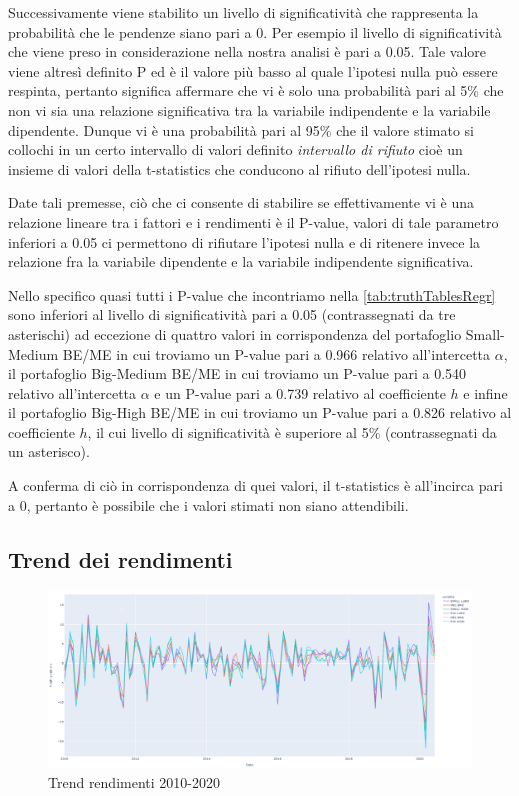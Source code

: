 Successivamente viene stabilito un livello di significatività che rappresenta la probabilità che le pendenze siano pari a 0. Per esempio il livello di significatività che viene preso in considerazione nella nostra analisi è pari a 0.05. Tale valore viene altresì definito P ed è il valore più basso al quale l'ipotesi nulla può essere respinta, pertanto significa affermare che vi è solo una probabilità pari al 5\% che non vi sia una relazione significativa tra la variabile indipendente e la variabile dipendente. Dunque vi è una probabilità pari al 95\% che il valore stimato si collochi in un certo intervallo di valori definito \textit{intervallo di rifiuto} cioè un insieme di valori della t-statistics che conducono al rifiuto dell'ipotesi nulla.  

Date tali premesse, ciò che ci consente di stabilire se effettivamente vi è una relazione lineare tra i fattori e i rendimenti è il P-value, valori di tale parametro inferiori a 0.05 ci permettono di rifiutare l'ipotesi nulla e di ritenere invece la relazione fra la variabile dipendente e la variabile indipendente significativa. 

Nello specifico quasi tutti i P-value che incontriamo nella  \ref{tab:truthTablesRegr} sono inferiori al livello di significatività pari a 0.05 (contrassegnati da tre asterischi) ad eccezione di quattro valori in corrispondenza del portafoglio Small-Medium BE/ME in cui troviamo un P-value pari a 0.966 relativo all'intercetta $\alpha$, il portafoglio Big-Medium BE/ME in cui troviamo un P-value pari a 0.540 relativo all'intercetta $\alpha$ e un P-value pari a 0.739 relativo al coefficiente $h$ e infine il portafoglio Big-High BE/ME in cui troviamo un P-value pari a 0.826 relativo al coefficiente $h$, il cui livello di significatività è superiore al 5\% (contrassegnati da un asterisco). 

A conferma di ciò in corrispondenza di quei valori, il t-statistics è all'incirca pari a 0, pertanto è possibile che i valori stimati non siano attendibili.  

\subsection{Trend dei rendimenti}

\begin{figure}[h]
		\centering
	\includegraphics[width=1.1\linewidth]{"imgs/Trend rendimenti dal 2010"}
	\caption{Trend rendimenti 2010-2020}
	\label{fig:trend-rendimenti-dal-2010}
\end{figure}




